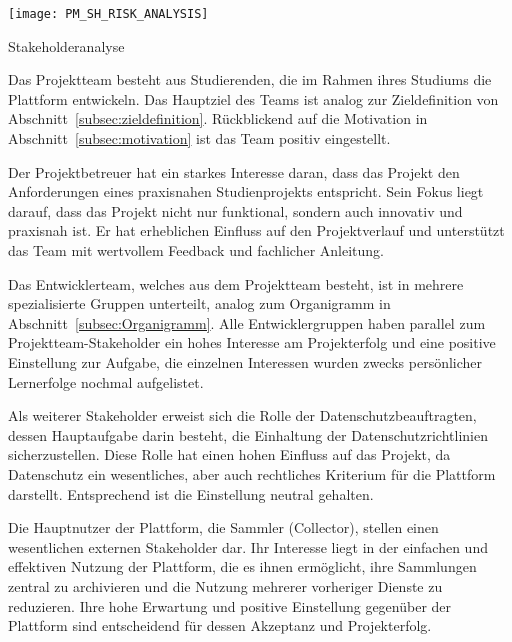 \begin{table}[h!]
    \centering
    \texttt{[image: PM\_SH\_RISK\_ANALYSIS]}
    \caption{Stakeholderanalyse}\label{tab:stakeholderanalyse}
\end{table}

Das Projektteam besteht aus Studierenden, die im Rahmen ihres Studiums die Plattform entwickeln.
Das Hauptziel des Teams ist analog zur Zieldefinition von Abschnitt~\ref{subsec:zieldefinition}.
Rückblickend auf die Motivation in Abschnitt~\ref{subsec:motivation} ist das Team positiv eingestellt. \par

Der Projektbetreuer hat ein starkes Interesse daran, dass das Projekt den Anforderungen eines praxisnahen Studienprojekts entspricht.
Sein Fokus liegt darauf, dass das Projekt nicht nur funktional, sondern auch innovativ und praxisnah ist.
Er hat erheblichen Einfluss auf den Projektverlauf und unterstützt das Team mit wertvollem Feedback und fachlicher Anleitung. \par

Das Entwicklerteam, welches aus dem Projektteam besteht, ist in mehrere spezialisierte Gruppen unterteilt, analog zum Organigramm in Abschnitt~\ref{subsec:Organigramm}.
Alle Entwicklergruppen haben parallel zum Projektteam-Stakeholder ein hohes Interesse am Projekterfolg und eine positive Einstellung zur Aufgabe, die einzelnen Interessen wurden zwecks persönlicher Lernerfolge nochmal aufgelistet. \par

Als weiterer Stakeholder erweist sich die Rolle der Datenschutzbeauftragten, dessen Hauptaufgabe darin besteht, die Einhaltung der Datenschutzrichtlinien sicherzustellen.
Diese Rolle hat einen hohen Einfluss auf das Projekt, da Datenschutz ein wesentliches, aber auch rechtliches Kriterium für die Plattform darstellt.
Entsprechend ist die Einstellung neutral gehalten. \par


Die Hauptnutzer der Plattform, die Sammler (Collector), stellen einen wesentlichen externen Stakeholder dar.
Ihr Interesse liegt in der einfachen und effektiven Nutzung der Plattform, die es ihnen ermöglicht, ihre Sammlungen zentral zu archivieren und die Nutzung mehrerer vorheriger Dienste zu reduzieren.
Ihre hohe Erwartung und positive Einstellung gegenüber der Plattform sind entscheidend für dessen Akzeptanz und Projekterfolg. \par

